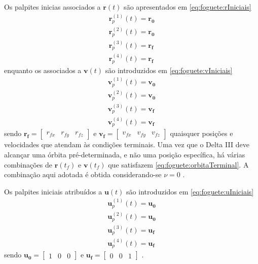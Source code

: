 
Os palpites inicias associados a $ \mathbf{r}(t) $ são apresentados em \eqref{eq:foguete:rIniciais}
%
\begin{equation}
	\label{eq:foguete:rIniciais}
	\begin{gathered}
		\mathbf{r}_p^{(1)}(t) = \mathbf{r_0} \\
		\mathbf{r}_p^{(2)}(t) = \mathbf{r_0} \\
		\mathbf{r}_p^{(3)}(t) = \mathbf{r_f} \\
		\mathbf{r}_p^{(4)}(t) = \mathbf{r_f} 
	\end{gathered}
\end{equation}
%
enquanto os associados a $ \mathbf{v}(t) $ são introduzidos em \eqref{eq:foguete:vIniciais}
%
\begin{equation}
	\label{eq:foguete:vIniciais}
	\begin{gathered}
		\mathbf{v}_p^{(1)}(t) = \mathbf{v_0} \\
		\mathbf{v}_p^{(2)}(t) = \mathbf{v_0} \\
		\mathbf{v}_p^{(3)}(t) = \mathbf{v_f} \\
		\mathbf{v}_p^{(4)}(t) = \mathbf{v_f} 
	\end{gathered}
\end{equation}
%
sendo $ \mathbf{r_f} = \begin{bmatrix} r_{fx} & r_{fy} & r_{fz} \end{bmatrix} $ e $ \mathbf{v_f} = \begin{bmatrix} v_{fx} & v_{fy} & v_{fz} \end{bmatrix} $ quaisquer posições e velocidades que atendam às condições terminais. Uma vez que o Delta III deve alcançar uma órbita pré-determinada, e não uma posição específica, há várias combinações de $ \mathbf{r}(t_f) $ e $ \mathbf{v}(t_f) $ que satisfazem \eqref{eq:foguete:orbitaTerminal}. A combinação aqui adotada é obtida considerando-se $ \nu = 0 $ \cite{becerra_psopt_2019}. 

Os palpites iniciais atribuídos a $ \mathbf{u}(t) $ são introduzidos em \eqref{eq:foguete:uIniciais}
%
\begin{equation}
	\label{eq:foguete:uIniciais}
	\begin{gathered}
		\mathbf{u}_p^{(1)}(t) = \mathbf{u_0} \\
		\mathbf{u}_p^{(2)}(t) = \mathbf{u_0} \\
		\mathbf{u}_p^{(3)}(t) = \mathbf{u_f} \\
		\mathbf{u}_p^{(4)}(t) = \mathbf{u_f} 
	\end{gathered}
\end{equation}
%
sendo $ \mathbf{u_0} = \begin{bmatrix} 1 & 0 & 0\end{bmatrix} $ e $ \mathbf{u_f} = \begin{bmatrix} 0 & 0 & 1\end{bmatrix} $ \cite{becerra_psopt_2019}.

